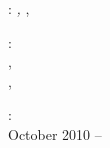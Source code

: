 \thispagestyle{empty}

\hfill

\vfill

\noindent\myName: \textit{\myTitle,} \mySubtitle, %
\textcopyright\ \myTime

\bigskip

\noindent{}: \\
\myProf, \myGradUniv \\
\myOtherProf, \myUgradUniv



\medskip

\noindent{}: \\
October 2010 -- \myTime
